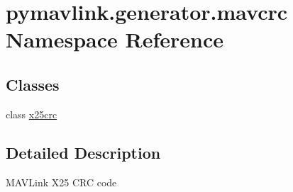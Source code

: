 \hypertarget{namespacepymavlink_1_1generator_1_1mavcrc}{}\section{pymavlink.\+generator.\+mavcrc Namespace Reference}
\label{namespacepymavlink_1_1generator_1_1mavcrc}
\subsection*{Classes}
\begin{DoxyCompactItemize}
\item 
class \mbox{\hyperlink{classpymavlink_1_1generator_1_1mavcrc_1_1x25crc}{x25crc}}
\end{DoxyCompactItemize}


\subsection{Detailed Description}
\begin{DoxyVerb}MAVLink X25 CRC code\end{DoxyVerb}
 